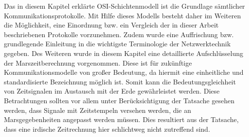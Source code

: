 Das in diesem Kapitel erkl{\"a}rte OSI-Schichtenmodell ist die Grundlage
s{\"a}mtlicher Kommunikationsprotokolle. Mit Hilfe dieses Modells besteht daher
im Weiteren die M{\"o}glichkeit, eine Einordnung bzw. ein Vergleich der in
dieser Arbeit beschriebenen Protokolle vorzunehmen. Zudem wurde eine Auffrischung bzw.
grundlegende Einleitung in die wichtigste Terminologie der Netzwerktechnik
gegeben. Des Weiteren wurde in diesem Kapitel eine detaillierte
Aufschl{\"u}sselung der Marszeitberechnung vorgenommen. Diese ist f{\"u}r
zuk{\"u}nftige Kommunikationsmodelle von gro{\ss}er Bedeutung, da hiermit eine
einheitliche und standardisierte Bezeichnung m{\"o}glich ist. Somit kann die
Bedeutungsgleichheit von Zeitsignalen im Austausch mit der Erde
gew{\"a}hrleistet werden. Diese Betrachtungen sollten vor allem unter
Ber{\"u}cksichtigung der Tatsache gesehen werden, dass Signale mit Zeitstempeln
versehen werden, die an Marsgegebenheiten angepasst werden m{\"u}ssen.
Dies resultiert aus der Tatsache, dass eine irdische Zeitrechnung hier
schlichtweg nicht zutreffend sind.


